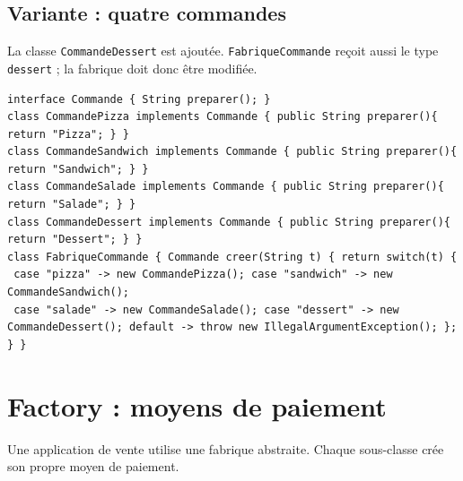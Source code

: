 \documentclass[11pt,a4paper]{article}
\begin{document}
\subsection{Variante : quatre commandes}
La classe \texttt{CommandeDessert} est ajoutée. \texttt{FabriqueCommande} reçoit aussi le type \texttt{dessert} ; la fabrique doit donc être modifiée.
\begin{center}\end{center}
\begin{lstlisting}
interface Commande { String preparer(); }
class CommandePizza implements Commande { public String preparer(){ return "Pizza"; } }
class CommandeSandwich implements Commande { public String preparer(){ return "Sandwich"; } }
class CommandeSalade implements Commande { public String preparer(){ return "Salade"; } }
class CommandeDessert implements Commande { public String preparer(){ return "Dessert"; } }
class FabriqueCommande { Commande creer(String t) { return switch(t) {
 case "pizza" -> new CommandePizza(); case "sandwich" -> new CommandeSandwich();
 case "salade" -> new CommandeSalade(); case "dessert" -> new CommandeDessert(); default -> throw new IllegalArgumentException(); }; } }
\end{lstlisting}

\section{Factory : moyens de paiement}
Une application de vente utilise une fabrique abstraite. Chaque sous-classe crée son propre moyen de paiement.
\end{document}
